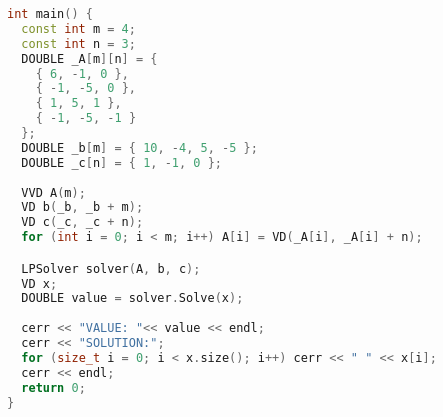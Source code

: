 \begin{lstlisting}[language=C++]
int main() {
  const int m = 4;
  const int n = 3;  
  DOUBLE _A[m][n] = {
    { 6, -1, 0 },
    { -1, -5, 0 },
    { 1, 5, 1 },
    { -1, -5, -1 }
  };
  DOUBLE _b[m] = { 10, -4, 5, -5 };
  DOUBLE _c[n] = { 1, -1, 0 };
  
  VVD A(m);
  VD b(_b, _b + m);
  VD c(_c, _c + n);
  for (int i = 0; i < m; i++) A[i] = VD(_A[i], _A[i] + n);

  LPSolver solver(A, b, c);
  VD x;
  DOUBLE value = solver.Solve(x);
  
  cerr << "VALUE: "<< value << endl;
  cerr << "SOLUTION:";
  for (size_t i = 0; i < x.size(); i++) cerr << " " << x[i];
  cerr << endl;
  return 0;
}
\end{lstlisting}